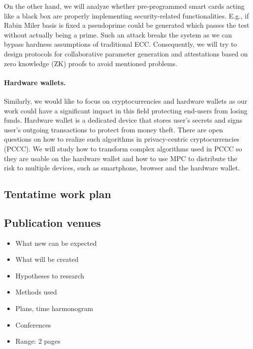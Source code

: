 \documentclass[
  digital, %
  twoside, %
  table,   %
  lof,     %
  lot,     %
]{fithesis3}
\theoremstyle{definition}
\theoremstyle{remark}
\begin{document}
On the other hand, we will analyze whether pre-programmed smart cards acting like a black box are properly implementing security-related functionalities. E.g., if Rabin Miler basis is fixed a pseudoprime could be generated which passes the test without actually being a prime. Such an attack breaks the system as we can bypass hardness assumptions of traditional ECC. Consequently, we will try to design protocols for collaborative parameter generation and attestations based on zero knowledge (ZK) proofs to avoid mentioned problems.

\paragraph{Hardware wallets.}
Similarly, we would like to focus on cryptocurrencies and hardware wallets as our work could have a significant impact in this field protecting end-users from losing funds. 
Hardware wallet is a dedicated device that stores user's secrets and signs user's outgoing transactions to protect from money theft. There are open questions on how to realize such algorithms in privacy-centric cryptocurrencies (PCCC).
We will study how to transform complex algorithms used in PCCC so they are usable on the hardware wallet and how to use MPC to distribute the risk to multiple devices, such as smartphone, browser and the hardware wallet. 

\subsection{Tentatime work plan}

\subsection{Publication venues}

\newpage
\begin{shaded}
	\begin{itemize}
		\item What new can be expected
		\item What will be created
		\item Hypotheses to research
		\item Methods used
		\item Plans, time harmonogram
		\item Conferences
		\item Range: 2 pages
	\end{itemize}
\end{shaded}
\end{document}
